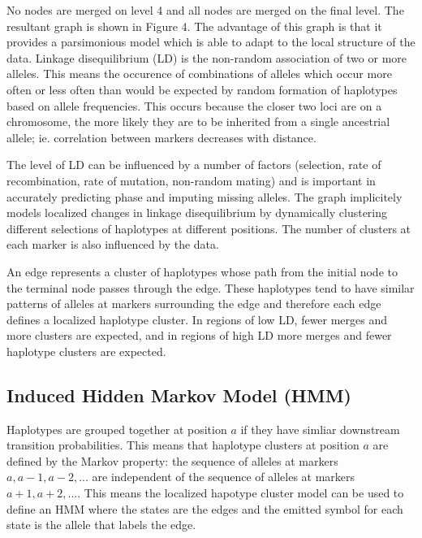 \documentclass[a4paper,11pt,twoside,abstraction,titlepage]{article}
\begin{document}
No nodes are merged on level 4 and all nodes are merged on the final level.  The resultant graph is shown in Figure 4. \cite{beagle1}
\newpage
\noindent The advantage of this graph is that it provides a parsimonious model which is able to adapt to the local structure of the data.  Linkage disequilibrium (LD) is the non-random association of two or more alleles.  This means the occurence of combinations of alleles which occur more often or less often than would be expected by random formation of haplotypes based on allele frequencies.  This occurs because the closer two loci are on a chromosome, the more likely they are to be inherited from a single ancestrial allele; ie. correlation between markers decreases with distance.

The level of LD can be influenced by a number of factors (selection, rate of recombination, rate of mutation, non-random mating) and is important in accurately predicting phase and imputing missing alleles.  The graph implicitely models localized changes in linkage disequilibrium by dynamically clustering different selections of haplotypes at different positions.  The number of clusters at each marker is also influenced by the data. \cite{LDwiki}

An edge represents a cluster of haplotypes whose path from the initial node to the terminal node passes through the edge.  These haplotypes tend to have similar patterns of alleles at markers surrounding the edge and therefore each edge defines a localized haplotype cluster.  In regions of low LD, fewer merges and more clusters are expected, and in regions of high LD more merges and fewer haplotype clusters are expected. \cite{beagle2}



\subsection{Induced Hidden Markov Model (HMM)}
Haplotypes are grouped together at position $a$ if they have simliar downstream transition probabilities.  This means that haplotype clusters at position $a$ are defined by the Markov property: the sequence of alleles at markers $a, a-1, a-2, ...$ are independent of the sequence of alleles at markers $a+1, a+2, ...$.  This means the localized hapotype cluster model can be used to define an HMM where the states are the edges and the emitted symbol for each state is the allele that labels the edge.
\end{document}
